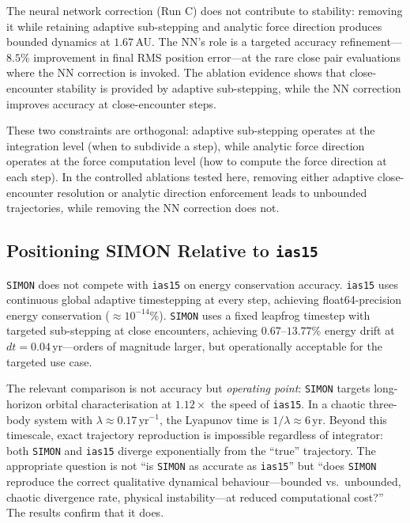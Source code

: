 \documentclass[12pt]{article}
\begin{document}
The neural network correction (Run C) does not contribute to stability: removing it
while retaining adaptive sub-stepping and analytic force direction produces bounded
dynamics at $1.67$\,AU. The NN's role is a targeted accuracy refinement---$8.5\%$
improvement in final RMS position error---at the rare close pair evaluations where
the NN correction is invoked. The ablation evidence shows that close-encounter
stability is provided by adaptive sub-stepping, while the NN correction improves
accuracy at close-encounter steps.

These two constraints are orthogonal: adaptive sub-stepping operates at the
integration level (when to subdivide a step), while analytic force direction operates
at the force computation level (how to compute the force direction at each step).
In the controlled ablations tested here, removing either adaptive close-encounter
resolution or analytic direction enforcement leads to unbounded trajectories, while
removing the NN correction does not.

\subsection{Positioning SIMON Relative to \texttt{ias15}}

\texttt{SIMON} does not compete with \texttt{ias15} on energy conservation accuracy.
\texttt{ias15} uses continuous global adaptive timestepping at every step, achieving
float64-precision energy conservation ($\approx 10^{-14}\%$). \texttt{SIMON} uses a
fixed leapfrog timestep with targeted sub-stepping at close encounters, achieving
$0.67$--$13.77\%$ energy drift at $dt = 0.04$\,yr---orders of magnitude larger, but
operationally acceptable for the targeted use case.

The relevant comparison is not accuracy but \emph{operating point}: \texttt{SIMON}
targets long-horizon orbital characterisation at $1.12\times$ the speed of
\texttt{ias15}. In a chaotic three-body system with $\lambda \approx 0.17$\,yr$^{-1}$,
the Lyapunov time is $1/\lambda \approx 6$\,yr. Beyond this timescale, exact
trajectory reproduction is impossible regardless of integrator: both \texttt{SIMON}
and \texttt{ias15} diverge exponentially from the ``true'' trajectory. The appropriate
question is not ``is \texttt{SIMON} as accurate as \texttt{ias15}'' but ``does
\texttt{SIMON} reproduce the correct qualitative dynamical behaviour---bounded vs.\
unbounded, chaotic divergence rate, physical instability---at reduced computational
cost?'' The results confirm that it does.
\end{document}
